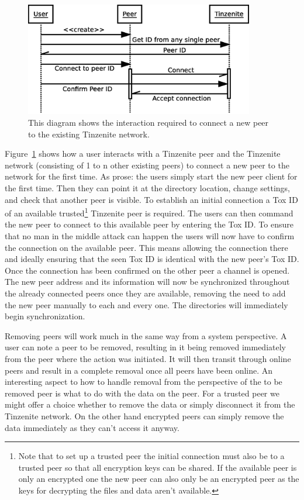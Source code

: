 \begin{figure}[htp]
\centering
    \includegraphics[width=10cm]{diagram/sequence_new_connect}
\caption[New Connection Sequence Diagram]{This diagram shows the interaction required to connect a new peer to the existing Tinzenite network.}
\label{diagram:new_connection}
\end{figure}

Figure~\ref{diagram:new_connection} shows how a user interacts with a Tinzenite peer and the Tinzenite network (consisting of 1 to n other existing peers) to connect a new peer to the network for the first time.
As prose: the users simply start the new peer client for the first time.
Then they can point it at the directory location, change settings, and check that another peer is visible.
To establish an initial connection a Tox ID of an available trusted\footnote{Note that to set up a trusted peer the initial connection must also be to a trusted peer so that all encryption keys can be shared. If the available peer is only an encrypted one the new peer can also only be an encrypted peer as the keys for decrypting the files and data aren't available.} Tinzenite peer is required.
The users can then command the new peer to connect to this available peer by entering the Tox ID.
To ensure that no man in the middle attack can happen the users will now have to confirm the connection on the available peer.
This means allowing the connection there and ideally ensuring that the seen Tox ID is identical with the new peer's Tox ID.
Once the connection has been confirmed on the other peer a channel is opened.
The new peer address and its information will now be synchronized throughout the already connected peers once they are available, removing the need to add the new peer manually to each and every one.
The directories will immediately begin synchronization.

Removing peers will work much in the same way from a system perspective.
A user can note a peer to be removed, resulting in it being removed immediately from the peer where the action was initiated.
It will then transit through online peers and result in a complete removal once all peers have been online.
An interesting aspect to how to handle removal from the perspective of the to be removed peer is what to do with the data on the peer.
For a trusted peer we might offer a choice whether to remove the data or simply disconnect it from the Tinzenite network.
On the other hand encrypted peers can simply remove the data immediately as they can't access it anyway.

